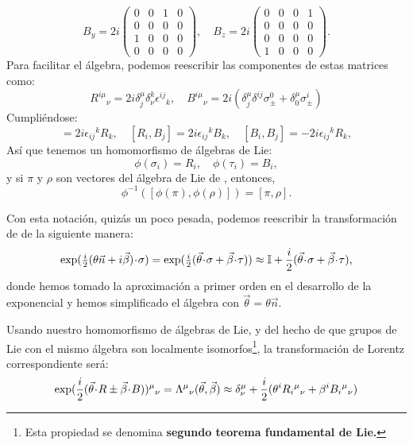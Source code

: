 \begin{equation*}
B_y=2i\begin{pmatrix}
0&0&1&0\\
0&0&0&0\\
1&0&0&0\\
0&0&0&0
\end{pmatrix},\quad
B_z=2i\begin{pmatrix}
0&0&0&1\\
0&0&0&0\\
0&0&0&0\\
1&0&0&0
\end{pmatrix}.
\end{equation*}
Para facilitar el álgebra, podemos reescribir las componentes de estas matrices como:
\begin{equation}
R^{i\mu}{}_\nu=2i\delta^\mu_j\delta^k_\nu\epsilon^{ij}{}_k,
\quad
B^{i\mu}{}_\nu=2i(\delta^\mu_j\delta^{ij}\sigma_\pm^0+\delta^\mu_0\sigma_\pm^i)
\label{erre}
\end{equation}
Cumpliéndose:
\begin{equation}
[R_i,R_j]=2i\epsilon_{ij}{}^kR_k,
\quad
[R_i,B_j]=2i\epsilon_{ij}{}^kB_k,
\quad
[B_i,B_j]=-2i\epsilon_{ij}{}^kR_k,
\end{equation}
Así que tenemos un homomorfismo de álgebras de Lie:
\begin{equation}
\phi(\sigma_i)=R_i,\quad\phi(\tau_i)=B_i,
\end{equation}
y si $\pi$ y $\rho$ son vectores del álgebra de Lie de \gldc, entonces,
\begin{equation}
\phi^{-1}([\phi(\pi),\phi(\rho)])=[\pi,\rho].
\end{equation}
\par Con esta notación, quizás un poco pesada, podemos reescribir la transformación de \gldc de la siguiente manera:
\begin{equation}
\exp(\tfrac i2(\theta \vec n+ i\vec\beta)\jdot\sigma)
=\exp(\tfrac i2(\vec\theta\jdot\sigma+\vec\beta\jdot\tau))
\approx\id+\frac i2(\vec\theta\jdot\sigma+\vec\beta\jdot\tau),
\end{equation}
donde hemos tomado la aproximación a primer orden en el desarrollo de la exponencial y hemos simplificado el álgebra con $\vec\theta=\theta\vec n$.
\par Usando nuestro homomorfismo de álgebras de Lie, y del hecho de que grupos de Lie con el mismo álgebra son localmente isomorfos\footnote{Esta propiedad se denomina {\bf segundo teorema fundamental de Lie.}}, la transformación de Lorentz correspondiente será:
\begin{equation}
\exp(\frac i2(\vec\theta\!\cdot\! R\pm\vec\beta\!\cdot\! B))^\mu{}_\nu
=\Lambda^\mu{}_\nu(\vec\theta,\vec\beta)
\approx \delta^\mu_\nu + \frac i2(\theta^iR_i{}^\mu{}_\nu+\beta^iB_i{}^\mu{}_\nu)
\end{equation}
